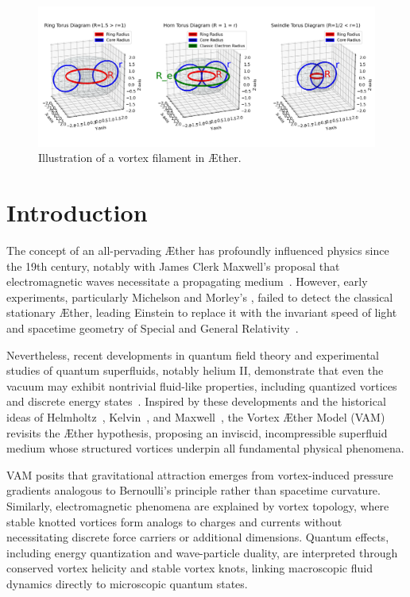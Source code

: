 

\begin{figure}[h]
    \includegraphics[width=\textwidth]{torus}
    \caption{Illustration of a vortex filament in Æther.}
    \label{fig:vortex}
\end{figure}


\section*{Introduction}

The concept of an all-pervading Æther has profoundly influenced physics since the 19th century, notably with James Clerk Maxwell's proposal that electromagnetic waves necessitate a propagating medium~\cite{Maxwell1865}. However, early experiments, particularly Michelson and Morley's \cite{michelson1887}, failed to detect the classical stationary Æther, leading Einstein to replace it with the invariant speed of light and spacetime geometry of Special and General Relativity~\cite{einstein1916foundation}.

Nevertheless, recent developments in quantum field theory and experimental studies of quantum superfluids, notably helium II, demonstrate that even the vacuum may exhibit nontrivial fluid-like properties, including quantized vortices and discrete energy states~\cite{Wilczek1999,Donnelly1991quantized}. Inspired by these developments and the historical ideas of Helmholtz~\cite{helmholtz1867integrals}, Kelvin~\cite{kelvin1867vortex}, and Maxwell~\cite{Maxwell1865}, the Vortex Æther Model (VAM) revisits the Æther hypothesis, proposing an inviscid, incompressible superfluid medium whose structured vortices underpin all fundamental physical phenomena.

VAM posits that gravitational attraction emerges from vortex-induced pressure gradients analogous to Bernoulli's principle rather than spacetime curvature. Similarly, electromagnetic phenomena are explained by vortex topology, where stable knotted vortices form analogs to charges and currents without necessitating discrete force carriers or additional dimensions. Quantum effects, including energy quantization and wave-particle duality, are interpreted through conserved vortex helicity and stable vortex knots, linking macroscopic fluid dynamics directly to microscopic quantum states.

